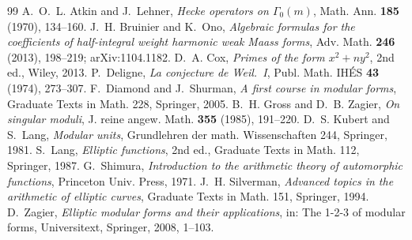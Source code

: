 \documentclass[11pt]{amsart}
\theoremstyle{definition}
\theoremstyle{remark}
\begin{document}
\begin{thebibliography}{99}
 A.~O.~L. Atkin and J.~Lehner, \emph{Hecke operators on $\Gamma_0(m)$},
Math. Ann. \textbf{185} (1970), 134--160.
 J.~H. Bruinier and K.~Ono, \emph{Algebraic formulas for the
coefficients of half-integral weight harmonic weak Maass forms}, Adv. Math.
\textbf{246} (2013), 198--219; arXiv:1104.1182.
 D.~A. Cox, \emph{Primes of the form $x^2+ny^2$}, 2nd ed., Wiley, 2013.
 P.~Deligne, \emph{La conjecture de Weil.~I}, Publ. Math. IH\'ES
\textbf{43} (1974), 273--307.
 F.~Diamond and J.~Shurman, \emph{A first course in modular forms},
Graduate Texts in Math. 228, Springer, 2005.
 B.~H. Gross and D.~B. Zagier, \emph{On singular moduli},
J. reine angew. Math. \textbf{355} (1985), 191--220.
 D.~S. Kubert and S.~Lang, \emph{Modular units}, Grundlehren
der math. Wissenschaften 244, Springer, 1981.
 S.~Lang, \emph{Elliptic functions}, 2nd ed., Graduate Texts in
Math. 112, Springer, 1987.
 G.~Shimura, \emph{Introduction to the arithmetic theory of
automorphic functions}, Princeton Univ. Press, 1971.
 J.~H. Silverman, \emph{Advanced topics in the arithmetic of
elliptic curves}, Graduate Texts in Math. 151, Springer, 1994.
 D.~Zagier, \emph{Elliptic modular forms and their applications},
in: The 1-2-3 of modular forms, Universitext, Springer, 2008, 1--103.
\end{thebibliography}
\end{document}
